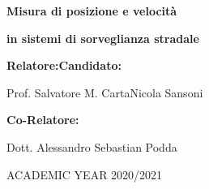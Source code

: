 \vspace{7em}

\noindent
\begin{center}
    \textbf{\Large Misura di posizione e velocità}\par
    \vspace{0.6em}
    \textbf{\Large in sistemi di sorveglianza stradale}\par
\end{center}{\LARGE \par}

\vspace{4cm}
\textbf{\large Relatore:}{\large \hfill{}}\textbf{\large Candidato:}{\large \par}

{\large Prof. Salvatore M. Carta\hfill{}Nicola Sansoni~}{\large \par}
\vspace{1cm}
\textbf{\large Co-Relatore:}{\large \par}
{\large Dott. Alessandro Sebastian Podda}

\vspace{2cm}

\begin{center}
    {\large ACADEMIC YEAR 2020/2021}{\large \par}
\end{center}
